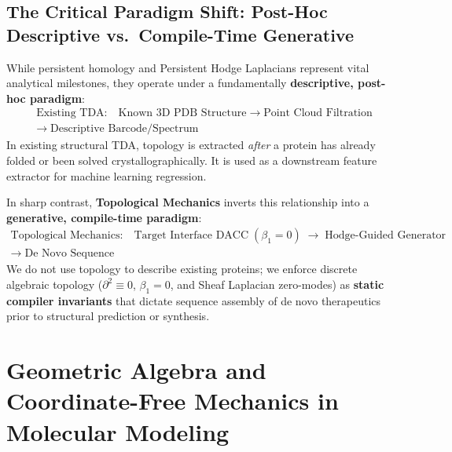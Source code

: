 \subsection{The Critical Paradigm Shift: Post-Hoc Descriptive vs.\ Compile-Time Generative}
While persistent homology and Persistent Hodge Laplacians represent vital analytical milestones,
they operate under a fundamentally \textbf{descriptive, post-hoc paradigm}:
\begin{multline}
    \text{Existing TDA:} \quad
    \text{Known 3D PDB Structure}
    \;\longrightarrow\;
    \text{Point Cloud Filtration} \\
    \longrightarrow\;
    \text{Descriptive Barcode/Spectrum}
\end{multline}
In existing structural TDA, topology is extracted \emph{after} a protein has already folded or
been solved crystallographically.  It is used as a downstream feature extractor for machine
learning regression.

In sharp contrast, \textbf{Topological Mechanics} inverts this relationship into a
\textbf{generative, compile-time paradigm}:
\begin{multline}
    \text{Topological Mechanics:} \quad
    \text{Target Interface DACC}\;(\beta_1 = 0)
    \;\longrightarrow\;
    \text{Hodge-Guided Generator} \\
    \longrightarrow\;
    \text{De Novo Sequence}
\end{multline}
We do not use topology to describe existing proteins; we enforce discrete algebraic topology
($\partial^2 \equiv 0$, $\beta_1 = 0$, and Sheaf Laplacian zero-modes) as \textbf{static
compiler invariants} that dictate sequence assembly of de novo therapeutics prior to structural
prediction or synthesis.

\section{Geometric Algebra and Coordinate-Free Mechanics in Molecular Modeling}
\label{sec:geometric_algebra}

